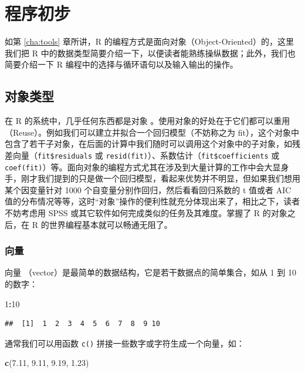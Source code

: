 \documentclass[
  b5paper,
  UTF8,twoside]{book}
\newenvironment{Shaded}{\begin{snugshade}}{\end{snugshade}}
\newcommand{\DecValTok}[1]{\textcolor[rgb]{0.00,0.00,0.81}{#1}}
\newcommand{\FloatTok}[1]{\textcolor[rgb]{0.00,0.00,0.81}{#1}}
\newcommand{\FunctionTok}[1]{\textcolor[rgb]{0.13,0.29,0.53}{\textbf{#1}}}
\newcommand{\NormalTok}[1]{#1}
\newcommand{\SpecialCharTok}[1]{\textcolor[rgb]{0.81,0.36,0.00}{\textbf{#1}}}
\begin{document}
\appendix


\chapter{程序初步}\label{chap:programming}

如第 \ref{cha:tools} 章所讲，R 的编程方式是面向对象（Object-Oriented）的，这里我们把 R 中的数据类型简要介绍一下，以便读者能熟练操纵数据；此外，我们也简要介绍一下 R 编程中的选择与循环语句以及输入输出的操作。

\section{对象类型}\label{sec:object}

在 R 的系统中，几乎任何东西都是对象 。使用对象的好处在于它们都可以重用（Reuse）。例如我们可以建立并拟合一个回归模型（不妨称之为 fit），这个对象中包含了若干子对象，在后面的计算中我们随时可以调用这个对象中的子对象，如残差向量（\texttt{fit\$residuals} 或 \texttt{resid(fit)}）、系数估计（\texttt{fit\$coefficients} 或 \texttt{coef(fit)}）等。面向对象的编程方式尤其在涉及到大量计算的工作中会大显身手，刚才我们提到的只是做一个回归模型，看起来优势并不明显，但如果我们想用某个因变量针对 1000 个自变量分别作回归，然后看看回归系数的 t 值或者 AIC 值的分布情况等等，这时``对象''操作的便利性就充分体现出来了，相比之下，读者不妨考虑用 SPSS 或其它软件如何完成类似的任务及其难度。掌握了 R 的对象之后，在 R 的世界编程基本就可以畅通无阻了。

\subsection{向量}\label{ux5411ux91cf}

向量 （vector）是最简单的数据结构，它是若干数据点的简单集合，如从 1 到 10 的数字：

\begin{Shaded}
\begin{Highlighting}[]
\DecValTok{1}\SpecialCharTok{:}\DecValTok{10}
\end{Highlighting}
\end{Shaded}

\begin{verbatim}
##  [1]  1  2  3  4  5  6  7  8  9 10
\end{verbatim}

通常我们可以用函数 \texttt{c()} 拼接一些数字或字符生成一个向量，如：

\begin{Shaded}
\begin{Highlighting}[]
\FunctionTok{c}\NormalTok{(}\FloatTok{7.11}\NormalTok{, }\FloatTok{9.11}\NormalTok{, }\FloatTok{9.19}\NormalTok{, }\FloatTok{1.23}\NormalTok{)}
\end{Highlighting}
\end{Shaded}
\end{document}
